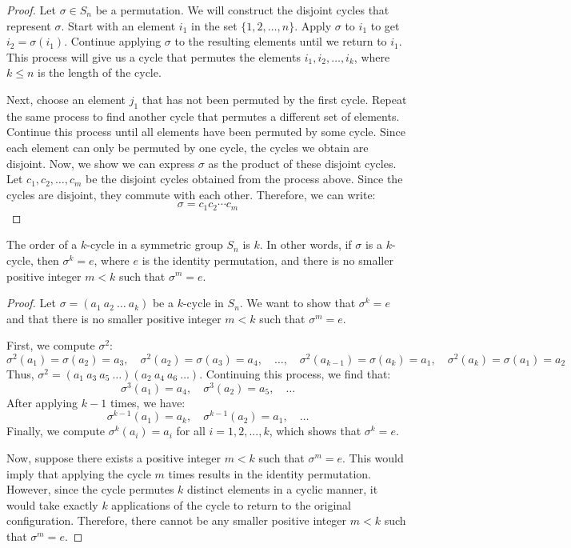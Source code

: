 \documentclass[openany]{book}
\begin{document}
\begin{proof}
    Let \( \sigma \in S_n \) be a permutation. We will construct the disjoint cycles that represent \( \sigma \). Start with an element \( i_1 \) in the set \( \{1, 2, \ldots, n\} \). Apply \( \sigma \) to \( i_1 \) to get \( i_2 = \sigma(i_1) \). Continue applying \( \sigma \) to the resulting elements until we return to \( i_1 \). This process will give us a cycle that permutes the elements \( i_1, i_2, \ldots, i_k \), where \( k \leq n\) is the length of the cycle. 

    Next, choose an element \( j_1 \) that has not been permuted by the first cycle. Repeat the same process to find another cycle that permutes a different set of elements. Continue this process until all elements have been permuted by some cycle. Since each element can only be permuted by one cycle, the cycles we obtain are disjoint.
    Now, we show we can express \( \sigma \) as the product of these disjoint cycles. Let \( c_1, c_2, \ldots, c_m \) be the disjoint cycles obtained from the process above. Since the cycles are disjoint, they commute with each other. Therefore, we can write:
    \[\sigma = c_1 c_2 \cdots c_m\]
\end{proof}
\begin{mytheorem}
    The order of a $k$-cycle in a symmetric group \( S_n \) is \( k \). In other words, if \( \sigma \) is a $k$-cycle, then \( \sigma^k = e \), where \( e \) is the identity permutation, and there is no smaller positive integer \( m < k \) such that \( \sigma^m = e \).
\end{mytheorem}
\begin{proof}
    Let \( \sigma = (a_1\ a_2\ \ldots\ a_k) \) be a $k$-cycle in \( S_n \). We want to show that \( \sigma^k = e \) and that there is no smaller positive integer \( m < k \) such that \( \sigma^m = e \). 

    First, we compute \( \sigma^2 \):
    \[
    \sigma^2(a_1) = \sigma(a_2) = a_3, \quad \sigma^2(a_2) = \sigma(a_3) = a_4, \quad \ldots, \quad \sigma^2(a_{k-1}) = \sigma(a_k) = a_1, \quad \sigma^2(a_k) = \sigma(a_1) = a_2
    \]
    Thus, \( \sigma^2 = (a_1\ a_3\ a_5\ \ldots)(a_2\ a_4\ a_6\ \ldots) \). Continuing this process, we find that:
    \[
    \sigma^3(a_1) = a_4, \quad \sigma^3(a_2) = a_5, \quad \ldots
    \]
    After applying \( k-1 \) times, we have:
    \[
    \sigma^{k-1}(a_1) = a_k, \quad \sigma^{k-1}(a_2) = a_1, \quad \ldots
    \]
    Finally, we compute \( \sigma^k(a_i) = a_i \) for all \( i = 1, 2, ..., k \), which shows that \( \sigma^k = e \).

    Now, suppose there exists a positive integer \( m < k \) such that \( \sigma^m = e \). This would imply that applying the cycle \( m \) times results in the identity permutation. However, since the cycle permutes \( k \) distinct elements in a cyclic manner, it would take exactly \( k \) applications of the cycle to return to the original configuration. Therefore, there cannot be any smaller positive integer \( m < k \) such that \( \sigma^m = e\).
\end{proof}
\end{document}
